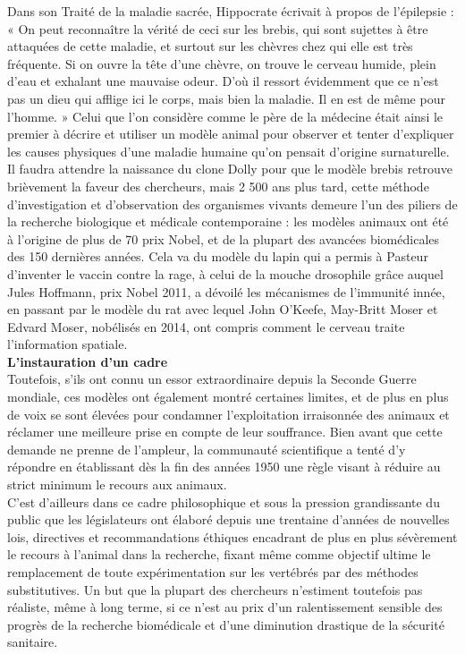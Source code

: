 \documentclass[10pt]{article}
\begin{document}
Dans son Traité de la maladie sacrée, Hippocrate écrivait à propos de l’épilepsie : « On peut reconnaître la vérité de ceci sur les brebis, qui sont sujettes à être attaquées de cette maladie, et surtout sur les chèvres chez qui elle est très fréquente. Si on ouvre la tête d’une chèvre, on trouve le cerveau humide, plein d’eau et exhalant une mauvaise odeur. D’où il ressort évidemment que ce n’est pas un dieu qui afflige ici le corps, mais bien la maladie. Il en est de même pour l’homme. » Celui que l’on considère comme le père de la médecine était ainsi le premier à décrire et utiliser un modèle animal pour observer et tenter d’expliquer les causes physiques d’une maladie humaine qu’on pensait d’origine surnaturelle. Il faudra attendre la naissance du clone Dolly pour que le modèle brebis retrouve brièvement la faveur des chercheurs, mais 2 500 ans plus tard, cette méthode d’investigation et d’observation des organismes vivants demeure l’un des piliers de la recherche biologique et médicale contemporaine : les modèles animaux ont été à l’origine de plus de 70 prix Nobel, et de la plupart des avancées biomédicales des 150 dernières années. Cela va du modèle du lapin qui a permis à Pasteur d’inventer le vaccin contre la rage, à celui de la mouche drosophile grâce auquel Jules Hoffmann, prix Nobel 2011, a dévoilé les mécanismes de l’immunité innée, en passant par le modèle du rat avec lequel John O’Keefe, May-Britt Moser et Edvard Moser, nobélisés en 2014, ont compris comment le cerveau traite l’information spatiale.\\

\textbf{L’instauration d’un cadre}\\

Toutefois, s’ils ont connu un essor extraordinaire depuis la Seconde Guerre mondiale, ces modèles ont également montré certaines limites, et de plus en plus de voix se sont élevées pour condamner l’exploitation irraisonnée des animaux et réclamer une meilleure prise en compte de leur souffrance. Bien avant que cette demande ne prenne de l’ampleur, la communauté scientifique a tenté d’y répondre en établissant dès la fin des années 1950 une règle visant à réduire au strict minimum le recours aux animaux.\\

C’est d’ailleurs dans ce cadre philosophique et sous la pression grandissante du public que les législateurs ont élaboré depuis une trentaine d’années de nouvelles lois, directives et recommandations éthiques encadrant de plus en plus sévèrement le recours à l’animal dans la recherche, fixant même comme objectif ultime le remplacement de toute expérimentation sur les vertébrés par des méthodes substitutives. Un but que la plupart des chercheurs n’estiment toutefois pas réaliste, même à long terme, si ce n’est au prix d’un ralentissement sensible des progrès de la recherche biomédicale et d’une diminution drastique de la sécurité sanitaire.\\
\end{document}
